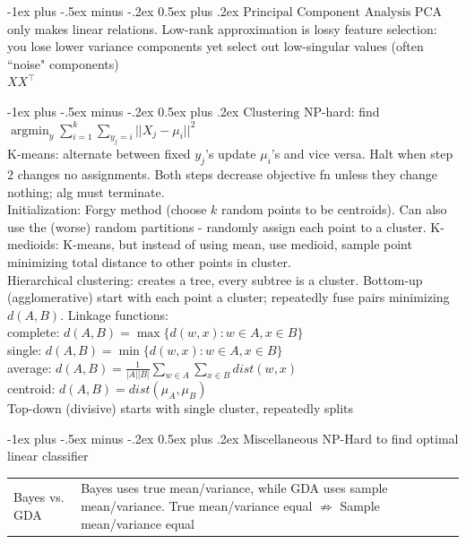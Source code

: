 \documentclass[10pt,landscape]{article}
\makeatletter
\DeclareMathOperator*{\argmin}{argmin}
\renewcommand{\section}{\@startsection{section}{1}{0mm}%
                                {-1ex plus -.5ex minus -.2ex}%
                                {0.5ex plus .2ex}%
                                {\normalfont\large\bfseries}}
\makeatother
\begin{document}
\begin{multicols}{3}
\section{$\boxed{\text{Principal Component Analysis}}$}
PCA only makes linear relations.
Low-rank approximation is lossy feature selection: you lose lower variance components yet select out low-singular values (often ``noise" components)
\\
$XX^\top$

\section{$\boxed{\text{Clustering}}$}
NP-hard: find $\argmin_y \sum_{i=1}^k \sum_{y_j=i} ||X_j -\mu_i||^2$\\
K-means: alternate between fixed $y_j$'s update $\mu_i$'s and vice versa. Halt when step 2 changes no assignments. Both steps decrease objective fn unless they change nothing; alg must terminate.\\
Initialization: Forgy method (choose $k$ random points to be centroids). Can also use the (worse) random partitions - randomly assign each point to a cluster.
K-medioids: K-means, but instead of using mean, use medioid, sample point minimizing total distance to other points in cluster.\\
Hierarchical clustering: creates a tree, every subtree is a cluster. Bottom-up (agglomerative) start with each point a cluster; repeatedly fuse pairs minimizing $d(A, B)$. Linkage functions: \\
complete: $d(A, B) = \max \{ d(w, x) : w \in A, x \in B \}$\\
single: $d(A, B) = \min \{d(w, x): w \in A, x \in B \}$\\
average:  $d(A, B) = \frac{1}{|A||B|}\sum_{w \in A} \sum_{x \in B} dist(w, x)$\\
centroid: $d(A, B) = dist(\mu_A, \mu_B)$\\
Top-down (divisive) starts with single cluster, repeatedly splits

\section{$\boxed{\text{Miscellaneous}}$}
NP-Hard to find optimal linear classifier
\begin{tabular}{@{}p{\the\MyLen}%
                @{}p{\linewidth-\the\MyLen}@{}}
Bayes vs. GDA & Bayes uses true mean/variance, while GDA uses sample mean/variance. True mean/variance equal $\not \Rightarrow$ Sample mean/variance equal\\


\end{tabular}
\end{multicols}
\end{document}

